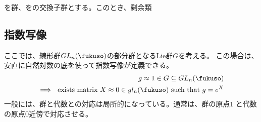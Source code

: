 {	\begin{proposition}[交換子群による商群]\label{prop:交換子群による商群} %
		を群、をの交換子群とする。このとき、剰余類
	\end{proposition} %
\subsection{指数写像}\label{s2:指数写像} %
	ここでは、線形群$GL_n(\fukuso)$の部分群となるLie群$G$を考える。
	この場合は、安直に自然対数の底を使って指数写像が定義できる。
	\begin{equation*}\begin{split}
		g\approx1\in G\subseteq GL_n(\fukuso) \\
		\implies \text{ exists matrix } 
		X\approx0\in gl_n(\fukuso) \text{ such that } g = e^X
	\end{split}\end{equation*}
	一般には、群と代数との対応は局所的になっている。通常は、群の原点$1$
	と代数の原点$0$近傍で対応させる。

}
